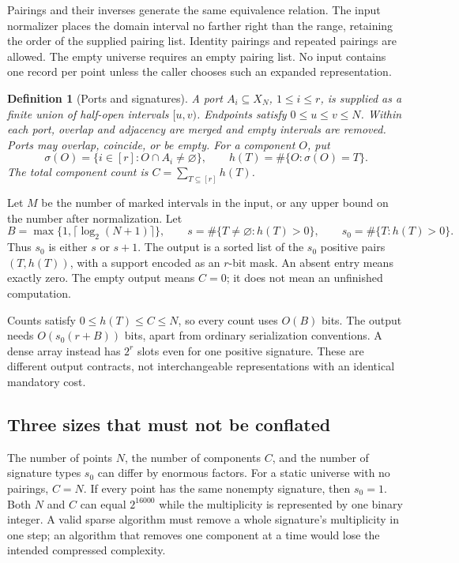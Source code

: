 \documentclass[11pt,letterpaper]{article}
\newtheorem{definition}[theorem]{Definition}
\begin{document}
Pairings and their inverses generate the same equivalence relation. The input
normalizer places the domain interval no farther right than the range,
retaining the order of the supplied pairing list. Identity pairings and
repeated pairings are allowed. The empty universe requires an empty pairing
list. No input contains one record per point unless the caller chooses such
an expanded representation.

\begin{definition}[Ports and signatures]
A port $A_i\subseteq X_N$, $1\leq i\leq r$, is supplied as a finite union of
half-open intervals $[u,v)$. Endpoints satisfy $0\leq u\leq v\leq N$.
Within each port, overlap and adjacency are merged and empty intervals are
removed. Ports may overlap, coincide, or be empty.
For a component $O$, put
\[
 \sigma(O)=\{i\in[r]:O\cap A_i\neq\varnothing\},\qquad
 h(T)=\#\{O:\sigma(O)=T\}.
\]
The total component count is $C=\sum_{T\subseteq[r]}h(T)$.
\end{definition}

Let $M$ be the number of marked intervals in the input, or any upper bound
on the number after normalization. Let
\[
 B=\max\{1,\lceil\log_2(N+1)\rceil\},\qquad
 s=\#\{T\neq\varnothing:h(T)>0\},\qquad
 s_0=\#\{T:h(T)>0\}.
\]
Thus $s_0$ is either $s$ or $s+1$. The output is a sorted list of the $s_0$
positive pairs $(T,h(T))$, with a support encoded as an $r$-bit mask. An absent
entry means exactly zero. The empty output means $C=0$; it does not mean an
unfinished computation.

Counts satisfy $0\leq h(T)\leq C\leq N$, so every count uses $O(B)$ bits.
The output needs $O(s_0(r+B))$ bits, apart from ordinary serialization
conventions. A dense array instead has $2^r$ slots even for one positive
signature. These are different output contracts, not interchangeable
representations with an identical mandatory cost.

\subsection{Three sizes that must not be conflated}
The number of points $N$, the number of components $C$, and the number of
signature types $s_0$ can differ by enormous factors. For a static universe
with no pairings, $C=N$. If every point has the same nonempty signature, then
$s_0=1$. Both $N$ and $C$ can equal $2^{16000}$ while the multiplicity is
represented by one binary integer. A valid sparse algorithm must remove a
whole signature's multiplicity in one step; an algorithm that removes one
component at a time would lose the intended compressed complexity.
\end{document}
